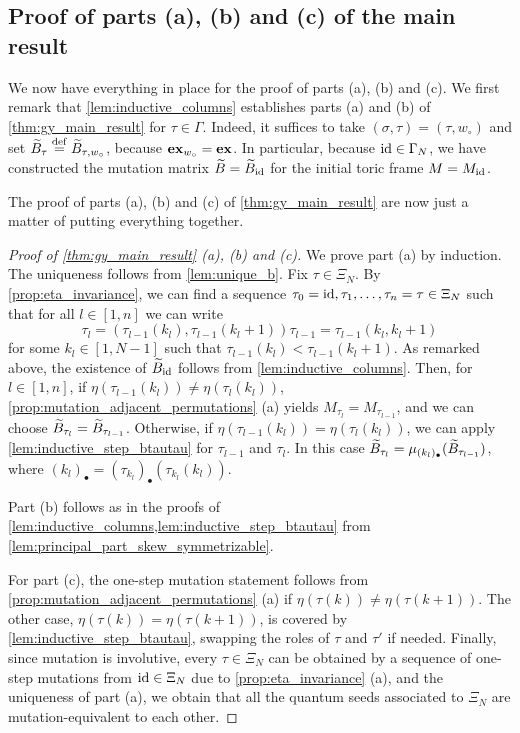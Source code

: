 \subsection{Proof of parts (a), (b) and (c) of the main result}

We now have everything in place for the proof of parts (a), (b) and (c). We first
remark that \cref{lem:inductive_columns} establishes parts (a) and (b) of
\cref{thm:gy_main_result} for $\tau \in \Gamma$. Indeed, it suffices to take $(\sigma,
	\tau) = (\tau, w_\circ)$ and set $\widetilde{B}_\tau \overset{\mathrm{def}}{=} \widetilde{B}_{\tau, w_\circ}$, because
$\mathbf{ex}_{w_\circ} = \mathbf{ex}$. In particular, because $\operatorname{id} \in \Gamma_N$, we have constructed
the mutation matrix $\widetilde{B} = \widetilde{B}_{\operatorname{id}}$ for the initial toric frame $M = M_{\operatorname{id}}$.

The proof of parts (a), (b) and (c) of \cref{thm:gy_main_result} are now just a matter
of putting everything together.
\begin{proof}[Proof of \cref{thm:gy_main_result} (a), (b) and (c)]
	We prove part (a) by induction. The uniqueness follows from \cref{lem:unique_b}. Fix $\tau \in \Xi_N$. By \cref{prop:eta_invariance}, we can find a sequence $\tau_0 = \operatorname{id}, \tau_1, \dots, \tau_n = \tau \in \Xi_N$ such that for all $l \in [1, n]$ we can write
	\begin{equation*}
		\tau_l = (\tau_{l-1}(k_l), \tau_{l-1}(k_l + 1))\tau_{l-1} = \tau_{l-1}(k_l, k_l + 1)
	\end{equation*}
	for some $k_l \in [1, N-1]$ such that $\tau_{l-1}(k_l) < \tau_{l-1}(k_l + 1)$. As
	remarked above, the existence of $\widetilde{B}_{\operatorname{id}}$ follows from \cref{lem:inductive_columns}.
	Then, for $l \in [1, n]$, if $\eta(\tau_{l-1}(k_l)) \neq \eta(\tau_l(k_l))$,
	\cref{prop:mutation_adjacent_permutations} (a) yields $M_{\tau_l} = M_{\tau_{l-1}}$,
	and we can choose $\widetilde{B}_{\tau_l} = \widetilde{B}_{\tau_{l-1}}$. Otherwise, if
	$\eta(\tau_{l-1}(k_l)) = \eta(\tau_l(k_l))$, we can apply
	\cref{lem:inductive_step_btautau} for $\tau_{l-1}$ and $\tau_{l}$. In this case
	$\widetilde{B}_{\tau_l} = \mu_{(k_l)_\bullet}(\widetilde{B}_{\tau_{l-1}})$, where $(k_l)_\bullet =
		(\tau_{k_l})_\bullet(\tau_{k_l}(k_l))$.

	Part (b) follows as in the proofs of
	\cref{lem:inductive_columns,lem:inductive_step_btautau} from
	\cref{lem:principal_part_skew_symmetrizable}.

	For part (c), the one-step mutation statement follows from
	\cref{prop:mutation_adjacent_permutations} (a) if $\eta(\tau(k)) \neq \eta(\tau(k +
			1))$. The other case, $\eta(\tau(k)) = \eta(\tau(k+1))$, is covered by
	\cref{lem:inductive_step_btautau}, swapping the roles of $\tau$ and $\tau'$ if needed.
	Finally, since mutation is involutive, every $\tau \in \Xi_N$ can be obtained by a
	sequence of one-step mutations from $\operatorname{id}\in \Xi_N$ due to \cref{prop:eta_invariance}
	(a), and the uniqueness of part (a), we obtain that all the quantum seeds associated to
	$\Xi_N$ are mutation-equivalent to each other.
\end{proof}

